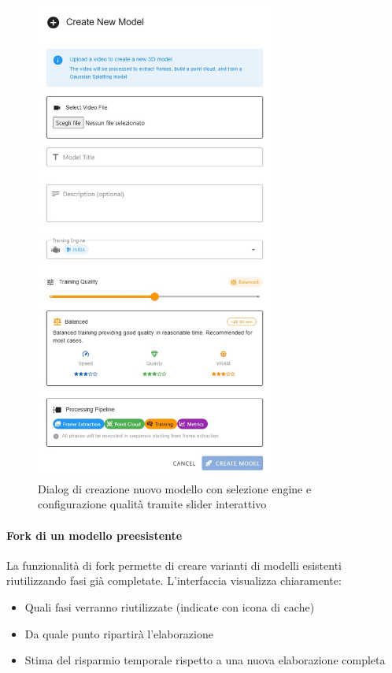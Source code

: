 \begin{figure}[htbp]
	\centering
	\includegraphics[width=0.7\textwidth]{images/fronted_new.jpg}
	\caption{Dialog di creazione nuovo modello con selezione engine e configurazione qualità tramite slider interattivo}
	\label{fig:new_model_dialog}
\end{figure}

\paragraph{Fork di un modello preesistente}
La funzionalità di fork permette di creare varianti di modelli esistenti riutilizzando fasi già completate. L'interfaccia visualizza chiaramente:
\begin{itemize}
	\item Quali fasi verranno riutilizzate (indicate con icona di cache)
	\item Da quale punto ripartirà l'elaborazione
	\item Stima del risparmio temporale rispetto a una nuova elaborazione completa
\end{itemize}

